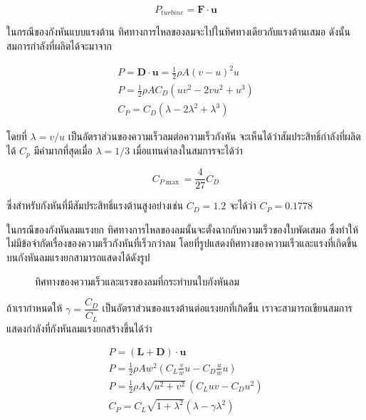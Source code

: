 \documentclass[a4paper,nobib,openany]{tufte-book}
\begin{document}
\[P_{turbine} = \mathbf{F} \cdot \mathbf{u}\]

ในกรณีของกังหันแบบแรงต้าน
ทิศทางการไหลของลมจะไปในทิศทางเดียวกับแรงต้านเสมอ
ดังนั้นสมการกำลังที่ผลิตได้จะมาจาก

\[\begin{gathered}
  P = \mathbf{D} \cdot \mathbf{u} = \frac{1}{2} \rho A (v - u)^2 u \nonumber \\
  P = \frac{1}{2} \rho A C_D (uv^2 - 2vu^2 + u^3) \nonumber \\
  C_P = C_D \left( \lambda - 2\lambda^2 + \lambda^3 \right)\end{gathered}\]

โดยที่ \(\lambda = v / u\) เป็นอัตราส่วนของความเร็วลมต่อความเร็วกังหัน
จะเห็นได้ว่าสัมประสิทธิ์กำลังที่ผลิตได้ \(C_p\) มีค่ามากที่สุดเมื่อ
\(\lambda = 1/3\) เมื่อแทนค่าลงในสมการจะได้ว่า

\[C_{P \max} = \dfrac{4}{27}C_D\]

ซึ่งสำหรับกังหันที่มีสัมประสิทธิ์แรงต้านสูงอย่างเช่น \(C_D = 1.2\)
จะได้ว่า \(C_P = 0.1778\)

ในกรณีของกังหันลมแรงยก
ทิศทางการไหลของลมนั้นจะตั้งฉากกับความเร็วของใบพัดเสมอ
ซึ่งทำให้ไม่มีข้อจำกัดเรื่องของความเร็วกังหันที่เร็วกว่าลม
โดยที่รูปแสดงทิศทางของความเร็วและแรงที่เกิดขึ้นบนกังหันลมแรงยกสามารถแสดงได้ดังรูป

\begin{figure}
  \centering
  \caption{ทิศทางของความเร็วและแรงของลมที่กระทำบนใบกังหันลม}
\end{figure}

ถ้าเรากำหนดให้ \(\gamma = \dfrac{C_D}{C_L}\)
เป็นอัตราส่วนของแรงต้านต่อแรงยกที่เกิดขึ้น
เราจะสามารถเขียนสมการแสดงกำลังที่กังหันลมแรงยกสร้างขึ้นได้ว่า

\[\begin{gathered}
  P = (\mathbf{L} + \mathbf{D}) \cdot \mathbf{u} \nonumber \\
  P = \frac{1}{2}\rho A w^2 (C_L \frac{v}{w} u - C_D \frac{u}{w}u) \nonumber \\
  P = \frac{1}{2}\rho A \sqrt{u^2 + v^2} \left( C_L u v - C_D u^2 \right) \nonumber \\
  C_P = C_L \sqrt{1+\lambda^2} \left( \lambda - \gamma \lambda^2 \right) \end{gathered}\]
\end{document}
